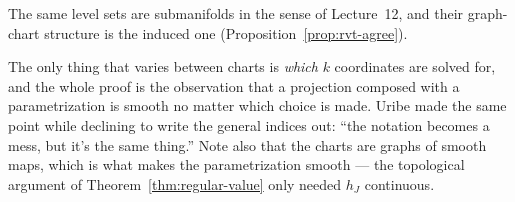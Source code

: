 \documentclass[11pt]{report}
\begin{document}
The same level sets are submanifolds in the sense of Lecture~12, and their graph-chart structure is the induced one (Proposition~\ref{prop:rvt-agree}).

\begin{rembox}\label{rem:euclidean}
The only thing that varies between charts is \emph{which} $k$ coordinates are solved for, and the whole proof is the observation that a projection composed with a parametrization is smooth no matter which choice is made. Uribe made the same point while declining to write the general indices out: ``the notation becomes a mess, but it's the same thing.'' Note also that the charts are graphs of smooth maps, which is what makes the parametrization smooth --- the topological argument of Theorem~\ref{thm:regular-value} only needed $h_J$ continuous.
\end{rembox}
\end{document}
